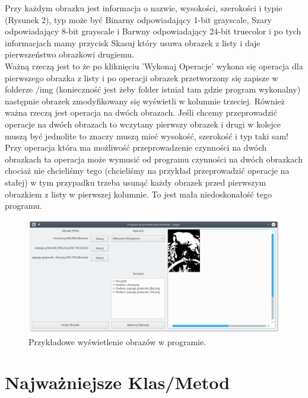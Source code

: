 \documentclass{article}
\begin{document}
Przy każdym obrazku jest informacja o nazwie, wysokości, szerokości i typie (Rysunek 2), typ może być Binarny odpowiadający 1-bit grayscale, Szary odpowiadający 8-bit grayscale i Barwny odpowiadający 24-bit truecolor i po tych informacjach mamy przycisk Skasuj który usuwa obrazek z listy i daje pierwszeństwo obrazkowi drugiemu.\\
Ważną rzeczą jest to że po kliknięciu 'Wykonaj Operacje' wykona się operacja dla pierwszego obrazka z listy i po operacji obrazek przetworzony się zapisze w folderze /img (konieczność jest żeby folder istniał tam gdzie program wykonalny) następnie obrazek zmodyfikowany się wyświetli w kolumnie trzeciej. Również ważna rzeczą jest operacja na dwóch obrazach. Jeśli chcemy przeprowadzić operacje na dwóch obrazach to wczytany pierwszy obrazek i drugi w kolejce muszą być jednolite to znaczy muszą mieć wysokość, szerokość i typ taki sam!\\

Przy operacja która ma możliwość przeprowadzenie czynności na dwóch obrazkach ta operacja może wymusić od programu czynności na dwóch obrazkach chociaż nie chcieliśmy tego (chcieliśmy na przykład przeprowadzić operacje na stałej) w tym przypadku trzeba usunąć każdy obrazek przed pierwszym obrazkiem z listy w pierwszej kolumnie. To jest mała niedoskonałość tego programu.

\begin{figure}[!htb]
\centering
\includegraphics[scale=0.4]{img/example.png} 
\caption{Przykładowe wyświetlenie obrazów w programie.}
\label{fig:verticalcell}
\end{figure}

\FloatBarrier
\section{Najważniejsze Klas/Metod}
\end{document}
